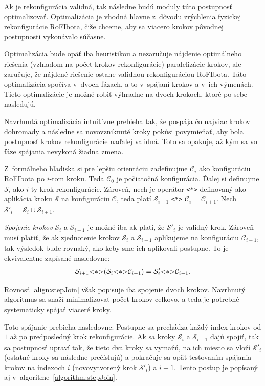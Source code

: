 \documentclass[
  printed, %
  oneside, %
  notable,   %
  nolof,     %
  nolot,     %
]{fithesis3}
\begin{document}
Ak je rekonfigurácia validná, tak následne budú moduly túto postupnosť optimalizovať. Optimalizácia je vhodná hlavne z~dôvodu zrýchlenia fyzickej rekonfigurácie RoFIbota, čiže chceme, aby sa viacero krokov pôvodnej postupnosti vykonávalo súčasne. 

Optimalizácia bude opäť iba heuristikou a nezaručuje nájdenie optimálneho riešenia (vzhľadom na počet krokov rekonfigurácie) paralelizácie krokov, ale zaručuje, že nájdené riešenie ostane validnou rekonfiguráciou RoFIbota. Táto optimalizácia spočíva v~dvoch fázach, a to v~spájaní krokov a v~ich výmenách. Tieto optimalizácie je možné robiť výhradne na dvoch krokoch, ktoré po sebe nasledujú. 

Navrhnutá optimalizácia intuitívne prebieha tak, že pospája čo najviac krokov dohromady a následne sa novovzniknuté kroky pokúsi povymieňať, aby bola postupnosť krokov rekonfigurácie naďalej validná. Toto sa opakuje, až kým sa vo fáze spájania nevykoná žiadna zmena. 

Z~formálneho hľadiska si pre lepšiu orientáciu zadefinujme $\mathcal{C}_i$ ako konfiguráciu RoFIbota po $i$-tom kroku. Teda $\mathcal{C}_0$ je počiatočná konfigurácia. Ďalej si definujme $\mathcal{S}_i$ ako $i$-ty krok rekonfigurácie. Zároveň, nech je operátor \lstinline{<*>} definovaný ako aplikácia kroku $\mathcal{S}$ na konfiguráciu $\mathcal{C}$, teda platí $\mathcal{S}_{i + 1}$ \lstinline{<*>} $\mathcal{C}_i = \mathcal{C}_{i + 1}$. Nech $\mathcal{S}'_i = \mathcal{S}_i \cup \mathcal{S}_{i + 1}$. 

\textit{Spojenie krokov} $\mathcal{S}_i$ a $\mathcal{S}_{i + 1}$ je možné iba ak platí, že $\mathcal{S}'_i$ je validný krok. Zároveň musí platiť, že ak zjednotenie krokov $\mathcal{S}_i$ a $\mathcal{S}_{i + 1}$ aplikujeme na konfiguráciu $\mathcal{C}_{i - 1}$, tak výsledok bude rovnaký, ako keby sme ich aplikovali postupne. To je ekvivalentne zapísané nasledovne: 
\begin{align}
\label{align:stepJoin}
\mathcal{S}_{i + 1} \lstinline{<*>} (\mathcal{S}_i \lstinline{<*>} \mathcal{C}_{i - 1}) = \mathcal{S}'_i \lstinline{<*>} \mathcal{C}_{i - 1}. 
\end{align}

Rovnosť \ref{align:stepJoin} však popisuje iba spojenie dvoch krokov. Navrhnutý algoritmus sa snaží minimalizovať počet krokov celkovo, a teda je potrebné systematicky spájať viaceré kroky. 

Toto spájanie prebieha nasledovne: Postupne sa prechádza každý index krokov od $1$ až po predposledný krok rekonfigurácie. Ak sa kroky $\mathcal{S}_i$ a $\mathcal{S}_{i + 1}$ dajú spojiť, tak sa postupnosť upraví tak, že tieto dva kroky sa vymažú, na ich miesto sa vloží $\mathcal{S}'_i$ (ostatné kroky sa následne prečíslujú) a pokračuje sa opäť testovaním spájania krokov na indexoch $i$ (novovytvorený krok $\mathcal{S}'_i$) a $i + 1$. Tento postup je popísaný aj v~algoritme~\ref{algorithm:stepJoin}. 
\end{document}
